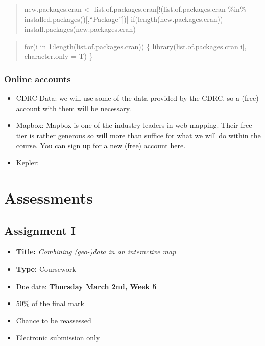 \documentclass[
  letterpaper,
  DIV=11,
  numbers=noendperiod]{scrreprt}
\providecommand{\tightlist}{%
  \setlength{\itemsep}{0pt}\setlength{\parskip}{0pt}}\usepackage{longtable,booktabs,array}
\begin{document}
\begin{quote}
new.packages.cran \textless-
list.of.packages.cran{[}!(list.of.packages.cran \%in\%
installed.packages(){[},``Package''{]}){]} if(length(new.packages.cran))
install.packages(new.packages.cran)
\end{quote}

\begin{quote}
for(i in 1:length(list.of.packages.cran)) \{
library(list.of.packages.cran{[}i{]}, character.only = T) \}
\end{quote}

\hypertarget{online-accounts}{%
\subsection*{Online accounts}\label{online-accounts}}

\begin{itemize}
\item
  CDRC Data: we will use some of the data provided by the CDRC, so a
  (free) account with them will be necessary.
\item
  Mapbox: Mapbox is one of the industry leaders in web mapping. Their
  free tier is rather generous so will more than suffice for what we
  will do within the course. You can sign up for a new (free) account
  here.
\item
  Kepler:
\end{itemize}


\hypertarget{assessments}{%
\chapter*{Assessments}\label{assessments}}


\hypertarget{assignment-i-1}{%
\section*{Assignment I}\label{assignment-i-1}}


\begin{itemize}
\tightlist
\item
  \textbf{Title:} \emph{Combining (geo-)data in an interactive map}
\item
  \textbf{Type:} Coursework
\item
  Due date: \textbf{Thursday March 2nd, Week 5}
\item
  50\% of the final mark
\item
  Chance to be reassessed
\item
  Electronic submission only
\end{itemize}
\end{document}

